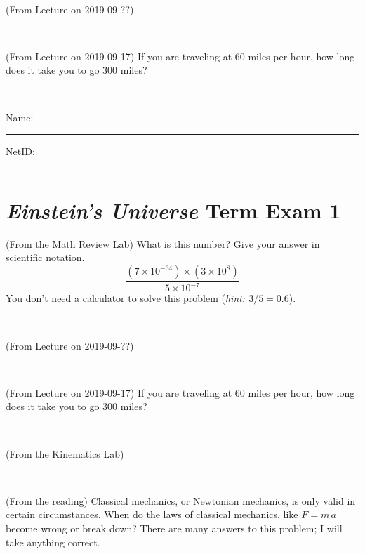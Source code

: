 \documentclass[12pt, letterpaper]{article}
\begin{document}
\vfill ~

\begin{problem} (From Lecture on 2019-09-??)
\end{problem}


\vfill ~

\begin{problem} (From Lecture on 2019-09-17)
If you are traveling at 60 miles per hour, how long does
it take you to go 300 miles?
\end{problem}


\vfill ~


\cleardoublepage



\noindent
Name: \rule[-1ex]{0.60\textwidth}{0.1pt}
NetID: \rule[-1ex]{0.20\textwidth}{0.1pt}

\section*{\textsl{Einstein's Universe} Term Exam 1}
\setcounter{problem}{1}


\begin{problem} (From the Math Review Lab)
What is this number? Give your answer in scientific notation.
$$
\frac{(7\times10^{-34})\times(3\times10^8)}{5\times10^{-7}}
$$
You don't need a calculator to solve this problem (\textit{hint: $3/5=0.6$}).
\end{problem}


\vfill ~

\begin{problem} (From Lecture on 2019-09-??)
\end{problem}


\vfill ~

\begin{problem} (From Lecture on 2019-09-17)
If you are traveling at 60 miles per hour, how long does
it take you to go 300 miles?
\end{problem}


\vfill ~

\begin{problem} (From the Kinematics Lab)

\end{problem}


\vfill ~


\clearpage


\begin{problem} (From the reading)
Classical mechanics, or Newtonian mechanics, is only valid in certain
circumstances. When do the laws of classical mechanics, like $F =
m\,a$ become wrong or break down? There are many answers to this
problem; I will take anything correct.
\end{problem}
\end{document}
